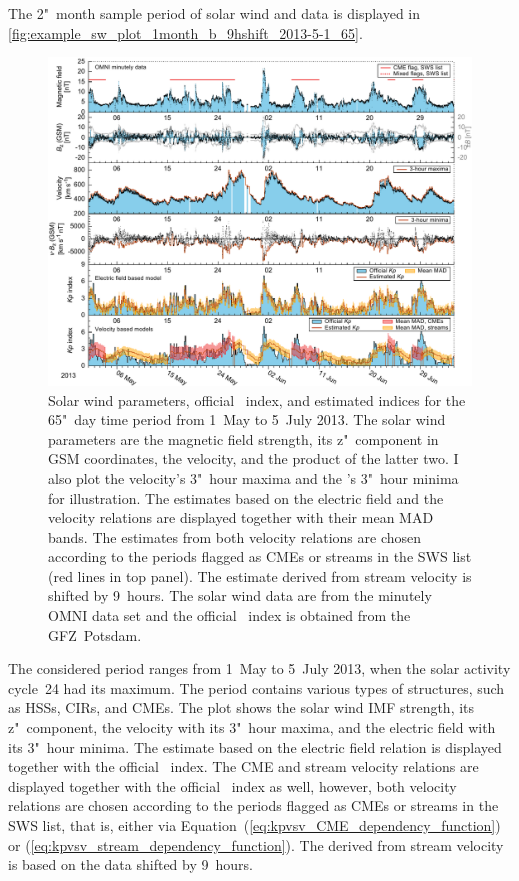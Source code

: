 The 2"~month sample period of solar wind and \Kp{} data is displayed in \autoref{fig:example_sw_plot_1month_b_9hshift_2013-5-1_65}.
\begin{figure}[htb]
	\centering
	\includegraphics[width=\textwidth]{figures_of_mine/chapter2/example_sw_plot_1month_b_9hshift_2013-5-1_65.pdf}
	\caption[I created the figure myself.]
	{Solar wind parameters, official \Kp~index, and estimated \Kp{} indices for the 65"~day time period from 1~May to 5~July 2013. The solar wind parameters are the magnetic field strength, its z"~component in GSM coordinates, the velocity, and the product of the latter two. I also plot the velocity's 3"~hour maxima and the \vBz{}'s 3"~hour minima for illustration. The \Kp{} estimates based on the electric field and the velocity relations are displayed together with their mean MAD bands. The \Kp{} estimates from both velocity relations are chosen according to the periods flagged as CMEs or streams in the SWS list (red lines in top panel). The \Kp{} estimate derived from stream velocity is shifted by 9~hours. The solar wind data are from the minutely OMNI data set and the official \Kp~index is obtained from the GFZ~Potsdam.}
	\label{fig:example_sw_plot_1month_b_9hshift_2013-5-1_65}
\end{figure}
The considered period ranges from 1~May to 5~July 2013, when the solar activity cycle~24 had its maximum. The period contains various types of structures, such as HSSs, CIRs, and CMEs.
The plot shows the solar wind IMF strength, its z"~component, the velocity with its 3"~hour maxima, and the electric field \vBz{} with its 3"~hour minima. The \Kp{} estimate based on the electric field relation is displayed together with the official \Kp~index. The CME and stream velocity relations are displayed together with the official \Kp~index as well, however, both velocity relations are chosen according to the periods flagged as CMEs or streams in the SWS list, that is, either via Equation~(\ref{eq:kpvsv_CME_dependency_function}) or (\ref{eq:kpvsv_stream_dependency_function}). The \Kp{} derived from stream velocity is based on the data shifted by 9~hours.

